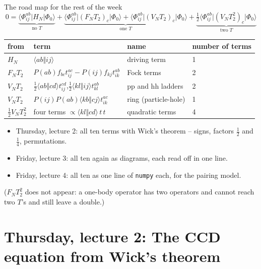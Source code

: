 \documentclass[aspectratio=169,10pt]{beamer}
\newcommand{\mel}[3]{\langle #1\lvert #2\rvert #3\rangle}
\newcommand{\ph}{\Phi_0}
\newcommand{\as}[4]{\langle #1#2\Vert #3#4\rangle}
\begin{document}
\begin{frame}[shrink=6]{The road map for the rest of the week}
\small
\[
 0=\underbrace{\mel{\Phi_{ij}^{ab}}{H_N}{\ph}}_{\text{no }T}
 +\underbrace{\mel{\Phi_{ij}^{ab}}{(F_NT_2)_c}{\ph}+\mel{\Phi_{ij}^{ab}}{(V_NT_2)_c}{\ph}}_{\text{one }T}
 +\underbrace{\tfrac12\mel{\Phi_{ij}^{ab}}{(V_NT_2^2)_c}{\ph}}_{\text{two }T}
\]
\begin{center}
\renewcommand{\arraystretch}{1.25}
\begin{tabular}{llll}
\toprule
from & term & name & number of terms\\
\midrule
$H_N$ & $\as abij$ & driving term & 1\\
$F_NT_2$ & $P(ab)f_{bc}t_{ij}^{ac}-P(ij)f_{kj}t_{ik}^{ab}$ & Fock terms & 2\\
$V_NT_2$ & $\tfrac12\as abcd t_{ij}^{cd}$,\quad $\tfrac12\as klij t_{kl}^{ab}$ & pp and hh ladders & 2\\
$V_NT_2$ & $P(ij)P(ab)\as kbcj t_{ik}^{ac}$ & ring (particle-hole) & 1\\
$\tfrac12V_NT_2^2$ & four terms $\propto\as klcd\,t\,t$ & quadratic terms & 4\\
\bottomrule
\end{tabular}
\end{center}
\begin{itemize}
\item Thursday, lecture 2: all ten terms with Wick's theorem -- signs, factors $\tfrac12$ and $\tfrac14$, permutations.
\item Friday, lecture 3: all ten again as diagrams, each read off in one line.
\item Friday, lecture 4: all ten as one line of \texttt{numpy} each, for the pairing model.
\end{itemize}
($F_NT_2^2$ does not appear: a one-body operator has two operators and cannot reach two $T$'s and still leave a double.)
\end{frame}

\section[Thursday 2: CCD with Wick]{Thursday, lecture 2: The CCD equation from Wick's theorem}
\end{document}
